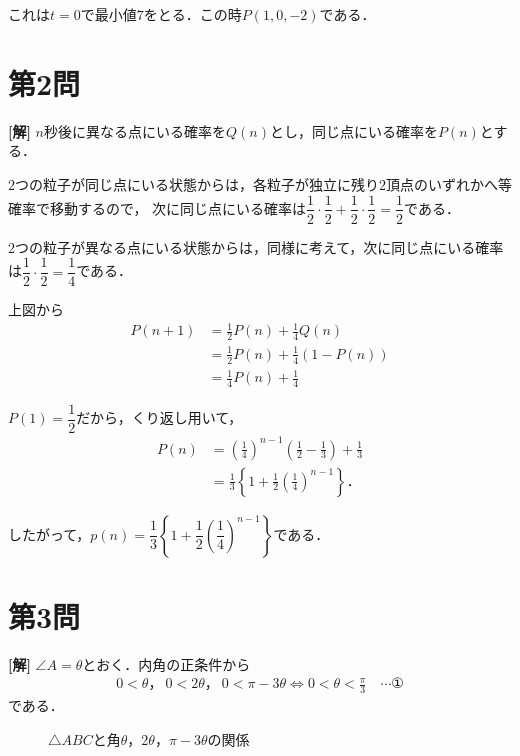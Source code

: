\documentclass[../main.tex]{subfiles}
\begin{document}
これは$t=0$で最小値$7$をとる．この時$P(1,0,-2)$である．

\newpage

\section*{第2問}

{\bf [解]}
$n$秒後に異なる点にいる確率を$Q(n)$とし，同じ点にいる確率を$P(n)$とする．

$2$つの粒子が同じ点にいる状態からは，各粒子が独立に残り$2$頂点のいずれかへ等確率で移動するので，
次に同じ点にいる確率は$\dfrac12\cdot\dfrac12+\dfrac12\cdot\dfrac12=\dfrac12$である．

$2$つの粒子が異なる点にいる状態からは，同様に考えて，次に同じ点にいる確率は$\dfrac12\cdot\dfrac12=\dfrac14$である．

上図から
\begin{align*}
  P(n+1)&=\frac12P(n)+\frac14Q(n)\\
  &=\frac12P(n)+\frac14(1-P(n))\\
  &=\frac14P(n)+\frac14
\end{align*}

$P(1)=\dfrac12$だから，くり返し用いて，
\begin{align*}
  P(n)&=\left(\frac14\right)^{n-1}\left(\frac12-\frac13\right)+\frac13\\
  &=\frac13\left\{1+\frac12\left(\frac14\right)^{n-1}\right\}．
\end{align*}

したがって，$p(n)=\dfrac13\left\{1+\dfrac12\left(\dfrac14\right)^{n-1}\right\}$である．

\newpage

\section*{第3問}

{\bf [解]}
$\angle A=\theta$とおく．内角の正条件から
\begin{align*}
  0<\theta，\ 0<2\theta，\ 0<\pi-3\theta \iff 0<\theta<\frac{\pi}{3}\quad\cdots①
\end{align*}
である．

\begin{figure}[htb]
  \centering
  \caption{$\triangle ABC$と角$\theta$，$2\theta$，$\pi-3\theta$の関係}
\end{figure}
\end{document}
